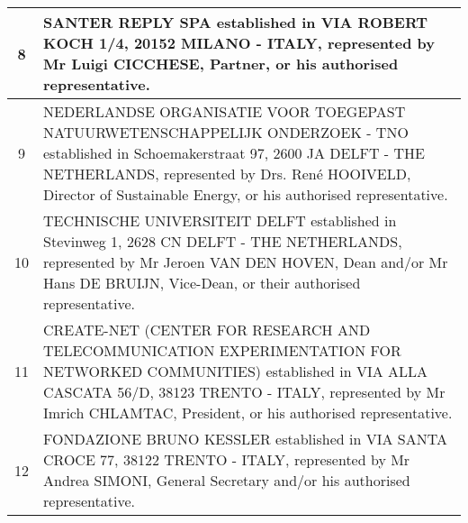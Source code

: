 \begin{longtable}{|c|p{14.5cm}|}
8 &	SANTER REPLY SPA established in VIA ROBERT KOCH 1/4, 20152 MILANO - ITALY, represented by Mr Luigi CICCHESE, Partner, or his authorised representative. \\ \hline
9 &	NEDERLANDSE ORGANISATIE VOOR TOEGEPAST NATUURWETENSCHAPPELIJK ONDERZOEK - TNO established in Schoemakerstraat 97, 2600 JA DELFT - THE NETHERLANDS, represented by Drs. Ren\'{e} HOOIVELD, Director of Sustainable
Energy, or his authorised representative. \\ \hline
10 &	TECHNISCHE UNIVERSITEIT DELFT established in Stevinweg 1, 2628 CN DELFT - THE NETHERLANDS, represented by Mr Jeroen VAN DEN HOVEN, Dean and/or Mr Hans DE BRUIJN, Vice-Dean, or their authorised representative. \\ \hline
11 &	CREATE-NET (CENTER FOR RESEARCH AND TELECOMMUNICATION
EXPERIMENTATION FOR NETWORKED COMMUNITIES) established in VIA ALLA CASCATA 56/D, 38123 TRENTO - ITALY, represented by Mr Imrich CHLAMTAC, President, or his authorised representative. \\ \hline
12 &	FONDAZIONE BRUNO KESSLER established in VIA SANTA CROCE 77, 38122
TRENTO - ITALY, represented by Mr Andrea SIMONI, General Secretary and/or his authorised representative. \\ \hline
\end{longtable}

\clearpage


{\hypersetup{linkcolor=black}
\tableofcontents}
